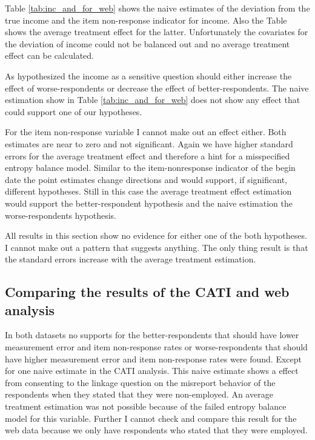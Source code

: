Table \ref{tab:inc_and_for_web} shows the naive estimates of the deviation from the true income and the item non-response indicator for income. Also the Table shows the average treatment effect for the latter. Unfortunately the covariates for the deviation of income could not be balanced out and no average treatment effect can be calculated.

As hypothesized the income as a sensitive question should either increase the effect of worse-respondents or decrease the effect of better-respondents. The naive estimation show in Table  \ref{tab:inc_and_for_web} does not show any effect that could support one of our hypotheses. 

For the item non-response variable  I cannot make out an effect either. Both estimates are near to zero and not significant. Again we have higher standard errors for the average treatment effect and therefore a hint for a misspecified entropy balance model. Similar to the item-nonresponse indicator of the begin date the point estimates change directions and would support, if significant, different hypotheses. Still in this case the average treatment effect estimation would support the better-respondent hypothesis and the naive estimation the worse-respondents hypothesis.  

All results in this section show no evidence for either one of the both hypotheses. I cannot make out a pattern that suggests anything. The only thing result is that the standard errors increase with the average treatment estimation.

\subsection{Comparing the results of the CATI and web analysis} 

In both datasets no supports for the better-respondents that should have lower measurement error and item non-response rates or worse-respondents that should have higher measurement error and item non-response rates were found. Except for one naive estimate in the CATI analysis. This naive estimate shows a effect from consenting to the linkage question on the misreport behavior of the respondents when they stated that they were non-employed. An average treatment estimation was not possible because of the failed entropy balance model for this variable. Further I cannot check and compare this result for the web data because we only have respondents who stated that they were employed. 


